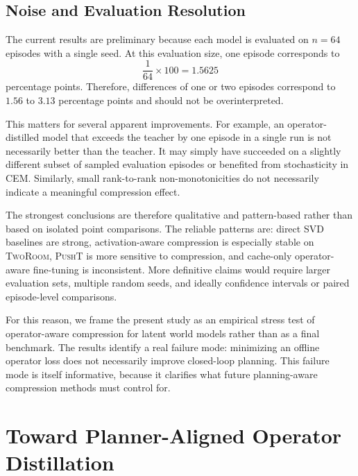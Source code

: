 \documentclass[11pt]{article}
\begin{document}
\subsection{Noise and Evaluation Resolution}
\label{sec:evaluation_noise_analysis}

The current results are preliminary because each model is evaluated on \(n=64\) episodes with a single seed. At this evaluation size, one episode corresponds to
\[
    \frac{1}{64} \times 100 = 1.5625
\]
percentage points. Therefore, differences of one or two episodes correspond to \(1.56\) to \(3.13\) percentage points and should not be overinterpreted.

This matters for several apparent improvements. For example, an operator-distilled model that exceeds the teacher by one episode in a single run is not necessarily better than the teacher. It may simply have succeeded on a slightly different subset of sampled evaluation episodes or benefited from stochasticity in CEM. Similarly, small rank-to-rank non-monotonicities do not necessarily indicate a meaningful compression effect.

The strongest conclusions are therefore qualitative and pattern-based rather than based on isolated point comparisons. The reliable patterns are: direct SVD baselines are strong, activation-aware compression is especially stable on \textsc{TwoRoom}, \textsc{PushT} is more sensitive to compression, and cache-only operator-aware fine-tuning is inconsistent. More definitive claims would require larger evaluation sets, multiple random seeds, and ideally confidence intervals or paired episode-level comparisons.

For this reason, we frame the present study as an empirical stress test of operator-aware compression for latent world models rather than as a final benchmark. The results identify a real failure mode: minimizing an offline operator loss does not necessarily improve closed-loop planning. This failure mode is itself informative, because it clarifies what future planning-aware compression methods must control for.

\section{Toward Planner-Aligned Operator Distillation}
\label{sec:planner_aligned_distillation}
\end{document}

